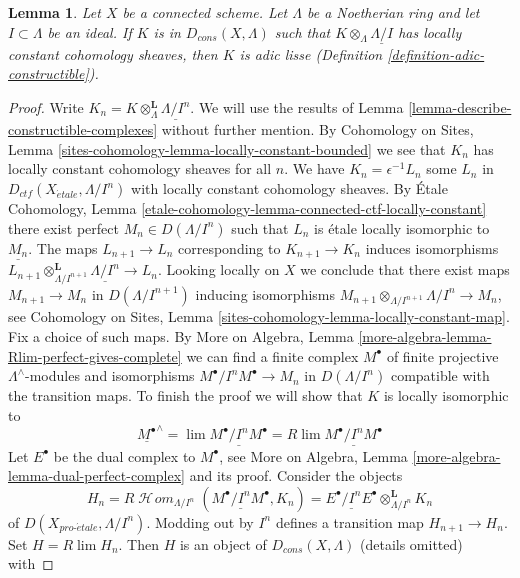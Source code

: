 \documentclass{stacks-project}
\theoremstyle{plain}
\newtheorem{lemma}[subsection]{Lemma}
\theoremstyle{definition}
\theoremstyle{remark}
\numberwithin{equation}{subsection}
\def\lim{\mathop{\mathrm{lim}}\nolimits}
\def\SheafHom{\mathop{\mathcal{H}\!\mathit{om}}\nolimits}
\def\proetale{{pro\text{-}\acute{e}tale}}
\def\etale{{\acute{e}tale}}
\begin{document}
\begin{lemma}
\label{lemma-connected-adic-lisse}
Let $X$ be a connected scheme. Let $\Lambda$ be a Noetherian ring and let
$I \subset \Lambda$ be an ideal. If $K$ is in $D_{cons}(X, \Lambda)$
such that $K \otimes_\Lambda \underline{\Lambda/I}$
has locally constant cohomology sheaves, then $K$ is adic lisse
(Definition \ref{definition-adic-constructible}).
\end{lemma}

\begin{proof}
Write $K_n = K \otimes_\Lambda^\mathbf{L} \underline{\Lambda/I^n}$.
We will use the results of Lemma \ref{lemma-describe-constructible-complexes}
without further mention. By Cohomology on Sites, Lemma
\ref{sites-cohomology-lemma-locally-constant-bounded}
we see that $K_n$ has locally constant cohomology sheaves for all $n$.
We have $K_n = \epsilon^{-1}L_n$ some $L_n$ in
$D_{ctf}(X_\etale, \Lambda/I^n)$ with locally constant cohomology sheaves.
By \'Etale Cohomology, Lemma
\ref{etale-cohomology-lemma-connected-ctf-locally-constant}
there exist perfect $M_n \in D(\Lambda/I^n)$
such that $L_n$ is \'etale locally isomorphic to $\underline{M_n}$.
The maps $L_{n + 1} \to L_n$ corresponding to $K_{n + 1} \to K_n$
induces isomorphisms
$L_{n + 1} \otimes_{\Lambda/I^{n + 1}}^\mathbf{L} \underline{\Lambda/I^n}
\to L_n$. Looking locally on $X$ we conclude that there
exist maps $M_{n + 1} \to M_n$ in $D(\Lambda/I^{n + 1})$
inducing isomorphisms
$M_{n + 1} \otimes_{\Lambda/I^{n + 1}} \Lambda/I^n \to M_n$, see
Cohomology on Sites, Lemma \ref{sites-cohomology-lemma-locally-constant-map}.
Fix a choice of such maps. By
More on Algebra, Lemma \ref{more-algebra-lemma-Rlim-perfect-gives-complete}
we can find a finite complex $M^\bullet$ of finite projective
$\Lambda^\wedge$-modules and isomorphisms $M^\bullet/I^nM^\bullet \to M_n$
in $D(\Lambda/I^n)$ compatible with the transition maps.
To finish the proof we will show that $K$ is locally isomorphic
to
$$
\underline{M^\bullet}^\wedge =
\lim \underline{M^\bullet/I^nM^\bullet} =
R\lim \underline{M^\bullet/I^nM^\bullet}
$$
Let $E^\bullet$ be the dual complex to $M^\bullet$, see
More on Algebra, Lemma \ref{more-algebra-lemma-dual-perfect-complex}
and its proof. Consider the objects
$$
H_n =
R\SheafHom_{\Lambda/I^n}(\underline{M^\bullet/I^nM^\bullet}, K_n) =
\underline{E^\bullet/I^nE^\bullet} \otimes_{\Lambda/I^n}^\mathbf{L} K_n
$$
of $D(X_\proetale, \Lambda/I^n)$. Modding out by $I^n$ defines a
transition map $H_{n + 1} \to H_n$. Set $H = R\lim H_n$. Then $H$ is an
object of $D_{cons}(X, \Lambda)$ (details omitted) with

\end{proof}
\end{document}
